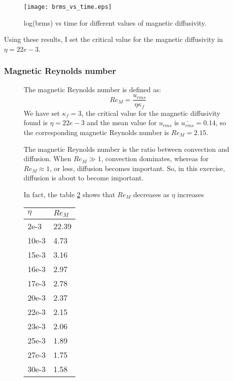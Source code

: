 \begin{figure}[h]
\centering
\texttt{[image: brms\_vs\_time.eps]}
\caption{log(brms) vs time for different values of  magnetic diffusivity.}
\label{fig:brmst}
 \end{figure}

Using these results, I set the critical value for the magnetic diffusivity in $\eta = 22e-3$.

\subsubsection{Magnetic Reynolds number}
\begin{figure}[h]
\begin{minipage}{.70\textwidth}
The magnetic Reynolds number is defined as:
\begin{equation}
 Re_M = \frac{u_{rms}}{\eta \kappa_f}
\end{equation}
We have set $\kappa_f = 3$, the critical value for the magnetic diffusivity found is  $\eta = 22e-3$ and the mean value for $u_{rms}$ is $\bar{u_{rms}} = 0.14$, so the corresponding magnetic Reynolds number is $Re_M = 2.15$.

The magnetic Reynolds number is the ratio between convection and diffusion. When $Re_M \gg 1$, convection dominates, whereas for $Re_M \approx 1$, or less, diffusion becomes important. So, in this exercise, diffusion is about to become important.

In fact, the table \ref{tab:re}  shows that $Re_M$ decreases as $\eta$ increases
 \end{minipage}
\hspace{0.5cm}
\begin{minipage}{.30\textwidth}
\begin{center}
\begin{tabular}{ll}
$\eta$ & $Re_M$\\\hline
2e-3 & 22.39\\
10e-3 & 4.73\\
15e-3 & 3.16\\
16e-3 & 2.97\\
17e-3 & 2.78\\
20e-3 & 2.37\\
22e-3 & 2.15\\
23e-3 & 2.06\\
25e-3 & 1.89\\
27e-3 & 1.75\\
30e-3 & 1.58\\
\end{tabular}
\label{tab:re}
\end{center}
\end{minipage}
\end{figure}



